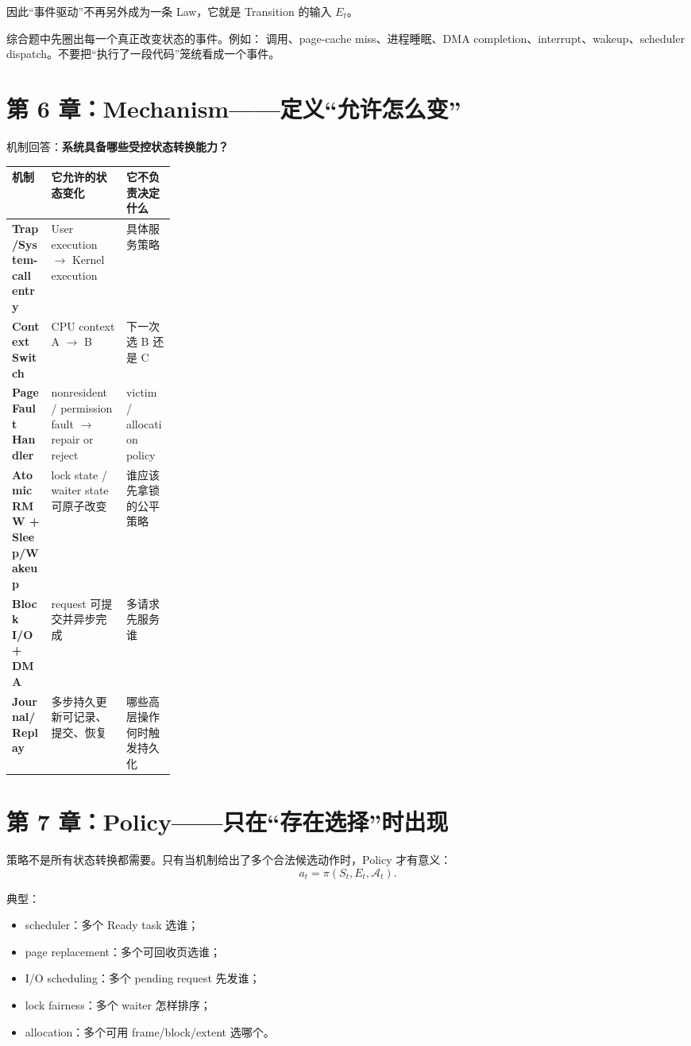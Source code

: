 \documentclass[11pt,a4paper]{ctexart}
\newcommand{\kw}[1]{\textbf{#1}}
\newcommand{\code}[1]{\texttt{\detokenize{#1}}}
\begin{document}
因此“事件驱动”不再另外成为一条 Law，它就是 Transition 的输入 $E_t$。

\begin{method}[事件识别法]
综合题中先圈出每一个真正改变状态的事件。例如：\code{read()} 调用、page-cache miss、进程睡眠、DMA completion、interrupt、wakeup、scheduler dispatch。不要把“执行了一段代码”笼统看成一个事件。
\end{method}

\section{第 6 章：Mechanism——定义“允许怎么变”}

机制回答：\kw{系统具备哪些受控状态转换能力？}

\begin{center}
\scriptsize
\begin{tabularx}{\linewidth}{>{\bfseries}p{0.24\linewidth} Y Y}
\toprule
机制 & 它允许的状态变化 & 它不负责决定什么 \\
\midrule
Trap/System-call entry & User execution $\to$ Kernel execution & 具体服务策略 \\
Context Switch & CPU context A $\to$ B & 下一次选 B 还是 C \\
Page Fault Handler & nonresident / permission fault $\to$ repair or reject & victim / allocation policy \\
Atomic RMW + Sleep/Wakeup & lock state / waiter state 可原子改变 & 谁应该先拿锁的公平策略 \\
Block I/O + DMA & request 可提交并异步完成 & 多请求先服务谁 \\
Journal/Replay & 多步持久更新可记录、提交、恢复 & 哪些高层操作何时触发持久化 \\
\bottomrule
\end{tabularx}
\end{center}

\section{第 7 章：Policy——只在“存在选择”时出现}

策略不是所有状态转换都需要。只有当机制给出了多个合法候选动作时，Policy 才有意义：
\[
\boxed{a_t=\pi(S_t,E_t,\mathcal A_t)}.
\]

典型：
\begin{itemize}
  \item scheduler：多个 Ready task 选谁；
  \item page replacement：多个可回收页选谁；
  \item I/O scheduling：多个 pending request 先发谁；
  \item lock fairness：多个 waiter 怎样排序；
  \item allocation：多个可用 frame/block/extent 选哪个。
\end{itemize}
\end{document}
